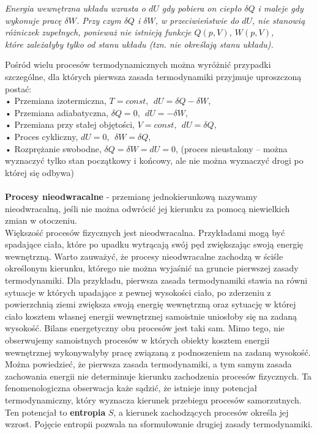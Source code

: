\documentclass[12pt,a4paper,openright]{report} %
\begin{document}
%
\begin{center}
\textit{Energia wewnętrzna układu wzrasta o $dU$ gdy pobiera on ciepło $\delta Q$ i maleje gdy wykonuje pracę $\delta W$. Przy czym $\delta Q$ i $\delta W$, w przeciwieństwie do $dU$, nie stanowią różniczek zupełnych, ponieważ nie istnieją funkcje $Q(p,V)$, $W(p,V)$, \\ które zależałyby tylko od stanu układu (tzn. nie określają stanu układu). 
}
\end{center}
Pośród wielu procesów termodynamicznych można wyróżnić przypadki szczególne, dla których pierwsza zasada termodynamiki przyjmuje uproszczoną postać:\\
• Przemiana izotermiczna, $T=const, ~~ dU=\delta Q- \delta W$, \\
• Przemiana adiabatyczna, $\delta Q=0, ~~ dU=-\delta W$, \\
• Przemiana przy stałej objętości, $V=const, ~~ dU=\delta Q$, \\
• Proces cykliczny, $dU=0, ~~ \delta W=\delta Q$, \\
• Rozprężanie swobodne, $\delta Q=\delta W=dU=0$, (proces nieustalony – można wyznaczyć tylko stan początkowy i końcowy, ale nie można wyznaczyć drogi po której się odbywa) \\
\\
\textbf{Procesy nieodwracalne} - przemianę jednokierunkową nazywamy nieodwracalną, jeśli nie można odwrócić jej kierunku za pomocą niewielkich zmian w otoczeniu. \\
Większość procesów fizycznych jest nieodwracalna. Przykładami mogą być spadające ciała, które po upadku wytrącają swój pęd zwiększając swoją energię wewnętrzną. Warto zauważyć, że procesy nieodwracalne zachodzą w ściśle określonym kierunku, którego nie można wyjaśnić na gruncie pierwszej zasady termodynamiki. Dla przykładu, pierwsza zasada termodynamiki stawia na równi sytuacje w których upadające z pewnej wysokości ciało, po zderzeniu z powierzchnią ziemi zwiększa swoją energię wewnętrzną oraz sytuację w której ciało kosztem własnej energii wewnętrznej samoistnie uniosłoby się na zadaną wysokość. Bilans energetyczny obu procesów jest taki sam. Mimo tego, nie obserwujemy samoistnych procesów w których obiekty kosztem energii wewnętrznej wykonywałyby pracę związaną z podnoszeniem na zadaną wysokość. Można powiedzieć, że pierwsza zasada termodynamiki, a tym samym zasada zachowania energii nie determinuje kierunku zachodzenia procesów fizycznych. Ta fenomenologiczna obserwacja każe sądzić, że istnieje inny potencjał termodynamiczny, który wyznacza kierunek przebiegu procesów samorzutnych. Ten potencjał to \textbf{entropia} $S$, a kierunek zachodzących procesów określa jej wzrost. Pojęcie entropii pozwala na sformułowanie drugiej zasady termodynamiki.\\
\end{document}

